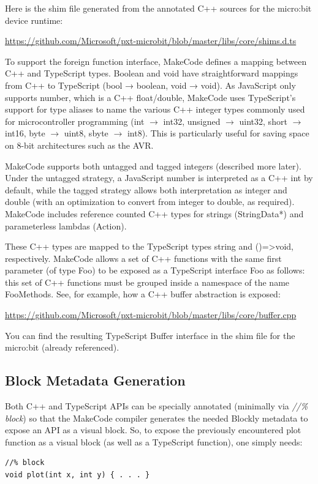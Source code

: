 Here is the shim file generated from the annotated C++ sources for the micro:bit device runtime: 
\begin{center}
\url{https://github.com/Microsoft/pxt-microbit/blob/master/libs/core/shims.d.ts}
\end{center}

To support the foreign function interface, MakeCode defines a mapping between C++ and TypeScript types.
Boolean and void have straightforward mappings from C++ to TypeScript (bool → boolean, void → void). 
As JavaScript only supports number, which is a C++ float/double, MakeCode uses TypeScript's support
for type aliases to name the various C++ integer types commonly used for microcontroller programming
(int $\rightarrow$ int32, unsigned $\rightarrow$  uint32, short $\rightarrow$ int16, 
byte $\rightarrow$ uint8, sbyte $\rightarrow$ int8).  This is particularly
useful for saving space on 8-bit architectures such as the AVR. 

MakeCode supports both untagged and tagged integers (described more later).  Under the untagged strategy,
a JavaScript number is interpreted as a C++ int by default, while the tagged strategy allows both
interpretation as integer and double (with an optimization to convert from integer to double, as required).  
MakeCode includes reference counted C++ types for strings (StringData*) and parameterless lambdas (Action).

These C++ types are mapped to the TypeScript types string and ()=>void, respectively.
MakeCode allows a set of C++ functions with the same first parameter (of type Foo) to be
exposed as a TypeScript interface Foo as follows: this set of C++ functions must be grouped
inside a namespace of the name FooMethods.  See, for example, how a C++ buffer abstraction is exposed:

\begin{center}
\url{https://github.com/Microsoft/pxt-microbit/blob/master/libs/core/buffer.cpp}
\end{center}

You can find the resulting TypeScript Buffer interface in the shim file for the micro:bit
(already referenced). 

\subsection{Block Metadata Generation}

Both C++ and TypeScript APIs can be specially annotated (minimally via 
\emph{//\% block}) so that the MakeCode compiler generates the needed
Blockly metadata to expose an API as a visual block. So, to expose the previously
encountered plot function as a visual block (as well as a TypeScript function), one simply needs:
\begin{lstlisting}
//% block
void plot(int x, int y) { . . . }
\end{lstlisting}

